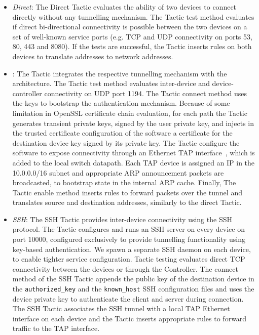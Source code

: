 \begin{itemize}

  \item \emph{Direct}: The Direct Tactic evaluates the
    ability of  two devices to connect directly without any
    tunnelling mechanism. The Tactic test method evaluates if direct
    bi-directional connectivity is possible between the two devices on a set of
    well-known service ports (e.g. TCP and UDP connectivity on ports 53, 80, 443
    and 8080). If the tests are successful, the Tactic inserts \of
    rules on both devices to translate \signpost addresses to 
    network addresses. 

  \item \emph{\openvpn}: The \openvpn Tactic integrates the
    respective tunnelling mechanism with the \signpost architecture. The Tactic
    test method evaluates inter-device and device-\signpost controller
    connectivity on UDP port 1194. The Tactic connect method uses the
    \signpost keys to bootstrap the \openvpn authentication mechanism.  Because
    of some limitation in OpenSSL certificate chain evaluation, for each path
    the Tactic generates transient private keys, signed by the user private key,
    and injects in the trusted certificate configuration of the \openvpn
    software a certificate for the destination device key signed by its private
    key.  The Tactic configure the \openvpn software to expose connectivity
    through
    an Ethernet TAP interface~, which is added to the local
    switch datapath. Each TAP device is assigned an IP in the 10.0.0.0/16 subnet
    and appropriate ARP announcement packets are broadcasted, to bootstrap state
    in the internal \openvpn ARP cache. Finally, The Tactic enable method
    inserts \of rules to forward packets over the \openvpn tunnel and translates
    source and destination addresses, similarly to the direct Tactic. 

  \item \emph{SSH}:  The SSH Tactic provides inter-device connectivity using the SSH
    protocol. The Tactic configures and runs an SSH server on every \signpost
    device on port 10000, configured exclusively to provide tunnelling
    functionality using key-based authentication. We spawn a separate SSH
    daemon on each device, to enable tighter service configuration.  Tactic
    testing evaluates direct TCP connectivity between the devices or through the
    \signpost Controller.  The connect method of the SSH Tactic appends the
    public key of the destination device in the \texttt{authorized\_key} and the
    \texttt{known\_host} SSH configuration files and uses the device private key to
    authenticate the client and server during connection.  The SSH Tactic
    associates the SSH tunnel with a local TAP Ethernet interface on each device
    and the Tactic inserts appropriate \of rules to forward traffic to the TAP
    interface.


\end{itemize}
